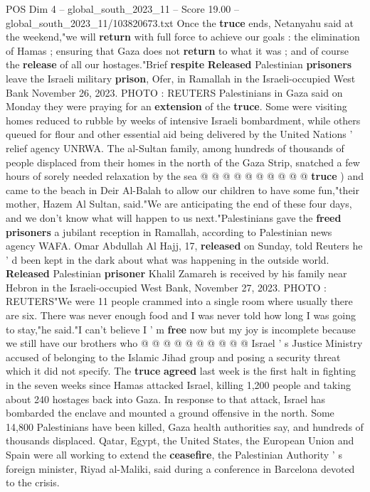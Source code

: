 \begin{textsample}{POS Dim 4 – global\_south\_2023\_11 – Score 19.00 – global\_south\_2023\_11/103820673.txt}
Once the \textbf{truce} ends, Netanyahu said at the weekend,"we will \textbf{return} with full force to achieve our goals : the elimination of Hamas ; ensuring that Gaza does not \textbf{return} to what it was ; and of course the \textbf{release} of all our hostages."Brief \textbf{respite} \textbf{Released} Palestinian \textbf{prisoners} leave the Israeli military \textbf{prison}, Ofer, in Ramallah in the Israeli-occupied West Bank November 26, 2023.
PHOTO : REUTERS Palestinians in Gaza said on Monday they were praying for an \textbf{extension} of the \textbf{truce}.
Some were visiting homes reduced to rubble by weeks of intensive Israeli bombardment, while others queued for flour and other essential aid being delivered by the United Nations ' relief agency UNRWA.
The al-Sultan family, among hundreds of thousands of people displaced from their homes in the north of the Gaza Strip, snatched a few hours of sorely needed relaxation by the sea @ @ @ @ @ @ @ @ @ @ \textbf{truce} ) and came to the beach in Deir Al-Balah to allow our children to have some fun,"their mother, Hazem Al Sultan, said."We are anticipating the end of these four days, and we don't know what will happen to us next."Palestinians gave the \textbf{freed} \textbf{prisoners} a jubilant reception in Ramallah, according to Palestinian news agency WAFA.
Omar Abdullah Al Hajj, 17, \textbf{released} on Sunday, told Reuters he ' d been kept in the dark about what was happening in the outside world. \textbf{Released} Palestinian \textbf{prisoner} Khalil Zamareh is received by his family near Hebron in the Israeli-occupied West Bank, November 27, 2023.
PHOTO : REUTERS"We were 11 people crammed into a single room where usually there are six.
There was never enough food and I was never told how long I was going to stay,"he said."I can't believe I ' m \textbf{free} now but my joy is incomplete because we still have our brothers who @ @ @ @ @ @ @ @ @ @ Israel ' s Justice Ministry accused of belonging to the Islamic Jihad group and posing a security threat which it did not specify.
The \textbf{truce} \textbf{agreed} last week is the first halt in fighting in the seven weeks since Hamas attacked Israel, killing 1,200 people and taking about 240 hostages back into Gaza.
In response to that attack, Israel has bombarded the enclave and mounted a ground offensive in the north.
Some 14,800 Palestinians have been killed, Gaza health authorities say, and hundreds of thousands displaced.
Qatar, Egypt, the United States, the European Union and Spain were all working to extend the \textbf{ceasefire}, the Palestinian Authority ' s foreign minister, Riyad al-Maliki, said during a conference in Barcelona devoted to the crisis.

\end{textsample}
